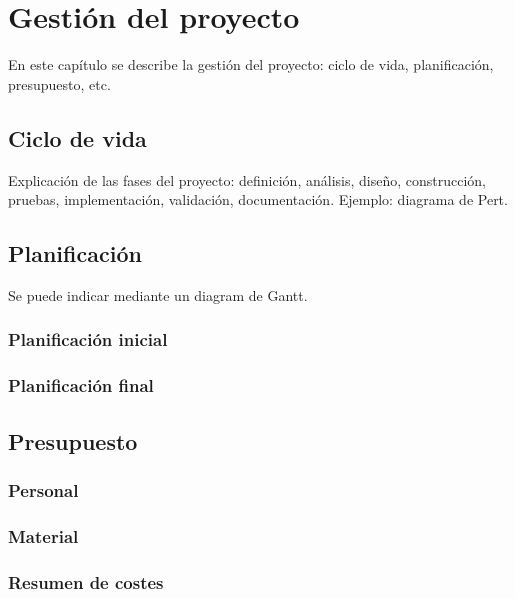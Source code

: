 \chapter{Gestión del proyecto}

En este capítulo se describe la gestión del proyecto: ciclo de vida, planificación, presupuesto, etc.

\section{Ciclo de vida}

Explicación de las fases del proyecto: definición, análisis, diseño, construcción, pruebas, implementación, validación, documentación. Ejemplo: diagrama de Pert.

\section{Planificación}

Se puede indicar mediante un diagram de Gantt.

\subsection{Planificación inicial}

\subsection{Planificación final}


\section{Presupuesto}

\subsection{Personal}

\subsection{Material}

\subsection{Resumen de costes}